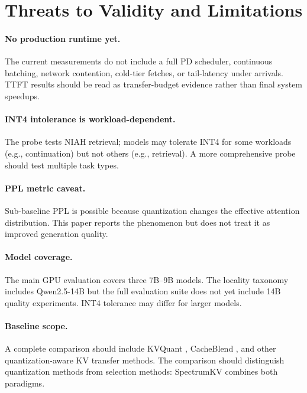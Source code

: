 \documentclass[11pt]{article}
\newcommand{\method}{SpectrumKV}
\theoremstyle{definition}
\theoremstyle{plain}
\begin{document}
\section{Threats to Validity and Limitations}
\label{sec:limitations}

\paragraph{No production runtime yet.}
The current measurements do not include a full PD scheduler, continuous batching, network contention, cold-tier fetches, or tail-latency under arrivals.  TTFT results should be read as transfer-budget evidence rather than final system speedups.

\paragraph{INT4 intolerance is workload-dependent.}
The probe tests NIAH retrieval; models may tolerate INT4 for some workloads (e.g., continuation) but not others (e.g., retrieval).  A more comprehensive probe should test multiple task types.

\paragraph{PPL metric caveat.}
Sub-baseline PPL is possible because quantization changes the effective attention distribution.  This paper reports the phenomenon but does not treat it as improved generation quality.

\paragraph{Model coverage.}
The main GPU evaluation covers three 7B--9B models.  The locality taxonomy includes Qwen2.5-14B but the full evaluation suite does not yet include 14B quality experiments.  INT4 tolerance may differ for larger models.

\paragraph{Baseline scope.}
A complete comparison should include KVQuant \citep{kvquant}, CacheBlend \citep{cacheblend}, and other quantization-aware KV transfer methods.  The comparison should distinguish quantization methods from selection methods: \method{} combines both paradigms.
\end{document}
